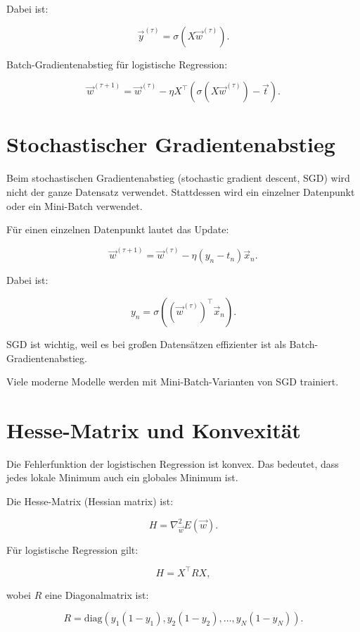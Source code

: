 Dabei ist:

\[
    \vec{y}^{(\tau)}
    =
    \sigma(X\vec{w}^{(\tau)}).
\]

\begin{definitionbox}
Batch-Gradientenabstieg für logistische Regression:

\[
    \vec{w}^{(\tau+1)}
    =
    \vec{w}^{(\tau)}
    -
    \eta
    X^{\top}
    (
        \sigma(X\vec{w}^{(\tau)})-\vec{t}
    ).
\]
\end{definitionbox}

\section{Stochastischer Gradientenabstieg}

Beim stochastischen Gradientenabstieg (stochastic gradient descent, SGD) wird nicht der ganze Datensatz verwendet.
Stattdessen wird ein einzelner Datenpunkt oder ein Mini-Batch verwendet.

Für einen einzelnen Datenpunkt lautet das Update:

\[
    \vec{w}^{(\tau+1)}
    =
    \vec{w}^{(\tau)}
    -
    \eta
    (y_n-t_n)\vec{x}_n.
\]

Dabei ist:

\[
    y_n
    =
    \sigma((\vec{w}^{(\tau)})^{\top}\vec{x}_n).
\]

\begin{conceptbox}
SGD ist wichtig, weil es bei großen Datensätzen effizienter ist als Batch-Gradientenabstieg.

Viele moderne Modelle werden mit Mini-Batch-Varianten von SGD trainiert.
\end{conceptbox}

\section{Hesse-Matrix und Konvexität}

Die Fehlerfunktion der logistischen Regression ist konvex.
Das bedeutet, dass jedes lokale Minimum auch ein globales Minimum ist.

Die Hesse-Matrix (Hessian matrix) ist:

\[
    H
    =
    \nabla_{\vec{w}}^2E(\vec{w}).
\]

Für logistische Regression gilt:

\[
    H
    =
    X^{\top}RX,
\]

wobei \(R\) eine Diagonalmatrix ist:

\[
    R
    =
    \mathrm{diag}
    \left(
        y_1(1-y_1),
        y_2(1-y_2),
        \dots,
        y_N(1-y_N)
    \right).
\]

